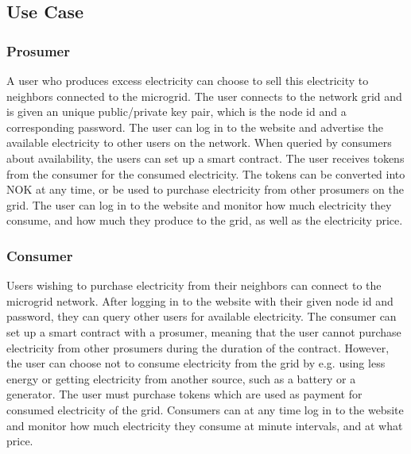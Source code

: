\subsection{Use Case}
\subsubsection*{Prosumer}
A user who produces excess electricity can choose to sell this electricity to neighbors connected to the microgrid. The user connects to the network grid and is given an unique public/private key pair, which is the node id and a corresponding password. The user can log in to the website and advertise the available electricity to other users on the network. When queried by consumers about availability, the users can set up a smart contract. The user receives tokens from the consumer for the consumed electricity. The tokens can be converted into NOK at any time, or be used to purchase electricity from other prosumers on the grid. The user can log in to the website and monitor how much electricity they consume, and how much they produce to the grid, as well as the electricity price. 
%

\subsubsection*{Consumer}
Users wishing to purchase electricity from their neighbors can connect to the microgrid network. After logging in to the website with their given node id and password, they can query other users for available electricity. The consumer can set up a smart contract with a prosumer, meaning that the user cannot purchase electricity from other prosumers during the duration of the contract. However, the user can choose not to consume electricity from the grid by e.g. using less energy or getting electricity from another source, such as a battery or a generator. The user must purchase tokens which are used as payment for consumed electricity of the grid. Consumers can at any time log in to the website and monitor how much electricity they consume at minute intervals, and at what price.

